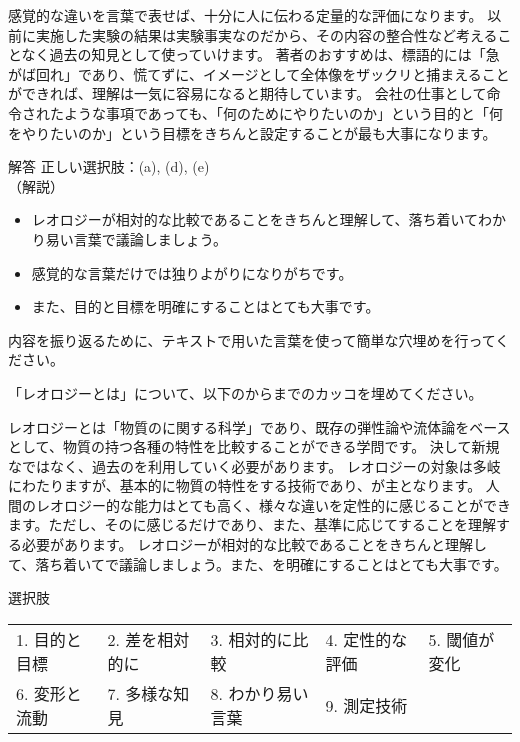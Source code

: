 \documentclass[uplatex,dvipdfmx,a4paper,11pt]{jsarticle}
\begin{document}
\begin{qlist}
\begin{qlist2}
            \qitem 感覚的な違いを言葉で表せば、十分に人に伝わる定量的な評価になります。
            \qitem 以前に実施した実験の結果は実験事実なのだから、その内容の整合性など考えることなく過去の知見として使っていけます。
			\qitem 著者のおすすめは、標語的には「急がば回れ」であり、慌てずに、イメージとして全体像をザックリと捕まえることができれば、理解は一気に容易になると期待しています。
			\qitem 会社の仕事として命令されたような事項であっても、「何のためにやりたいのか」という目的と「何をやりたいのか」という目標をきちんと設定することが最も大事になります。
		\end{qlist2}
        \begin{itembox}[l]{解答}
            正しい選択肢：(a), (d), (e)\\
            （解説）
            \begin{itemize}
                \item レオロジーが相対的な比較であることをきちんと理解して、落ち着いてわかり易い言葉で議論しましょう。
                \item 感覚的な言葉だけでは独りよがりになりがちです。
                \item また、目的と目標を明確にすることはとても大事です。
            \end{itemize}
        \end{itembox}
\end{qlist}

内容を振り返るために、テキストで用いた言葉を使って簡単な穴埋めを行ってください。

\begin{qparts}
    \qpart 「レオロジーとは」について、以下のからまでのカッコを埋めてください。
    \begin{qlist}
      \qitem レオロジーとは「物質の\qbox{}に関する科学」であり、既存の弾性論や流体論をベースとして、物質の持つ各種の特性を比較することができる学問です。
      決して新規な\qbox{}ではなく、過去の\qbox{}を利用していく必要があります。
      \qitem レオロジーの対象は多岐にわたりますが、基本的に物質の特性を\qbox{}する技術であり、\qbox{}が主となります。
      \qitem 人間のレオロジー的な能力はとても高く、様々な違いを定性的に感じることができます。ただし、その\qbox{}に感じるだけであり、また、基準に応じて\qbox{}することを理解する必要があります。
      \qitem レオロジーが相対的な比較であることをきちんと理解して、落ち着いて\qbox{}で議論しましょう。また、\qbox{}を明確にすることはとても大事です。
    \end{qlist}

    \begin{itembox}[l]{選択肢}
      \begin{center}
        \begin{tabular}{lllll}
                1. 目的と目標&2. 差を相対的に&3. 相対的に比較&4. 定性的な評価 & 5. 閾値が変化 \\
                6. 変形と流動&7. 多様な知見&8. わかり易い言葉 & 9. 測定技術
        \end{tabular}
      \end{center}
    \end{itembox}
\end{qparts}
\end{document}
